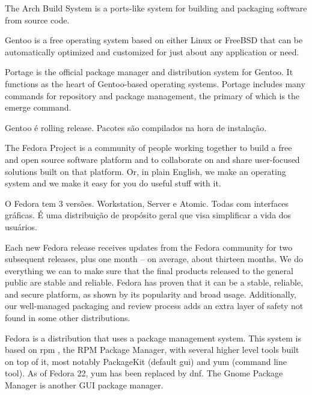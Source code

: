 \documentclass[
	article,			%
	12pt,				%
	openright,			%
	oneside,			%
	a4paper,			%
	chapter=TITLE,		%
	section=TITLE,		%
	subsection=TITLE,	%
	subsubsection=TITLE,%
	subsubsubsection=TITLE, %
	english,			%
	brazil,				%
	]{abntex2}
\begin{document}
\cite{ArchWiki2018c}

The Arch Build System is a ports-like system for building and packaging software from source code.

\cite{ArchWiki2018d}


Gentoo is a free operating system based on either Linux or FreeBSD that can be automatically optimized and customized for just about any application or need.

\cite{GentooWiki2018}

Portage is the official package manager and distribution system for Gentoo. It functions as the heart of Gentoo-based operating systems. Portage includes many commands for repository and package management, the primary of which is the emerge command.

\cite{GentooFundation2018}

Gentoo é rolling release.
Pacotes são compilados na hora de instalação.


The Fedora Project is a community of people working together to build a free and open source software platform and to collaborate on and share user-focused solutions built on that platform. Or, in plain English, we make an operating system and we make it easy for you do useful stuff with it.

\cite{FedoraProject2018}

O Fedora tem 3 versões. Workstation, Server e Atomic. Todas com interfaces gráficas. É uma distribuição de propósito geral que visa simplificar a vida dos usuários.

Each new Fedora release receives updates from the Fedora community for two subsequent releases, plus one month -- on average, about thirteen months. We do everything we can to make sure that the final products released to the general public are stable and reliable. Fedora has proven that it can be a stable, reliable, and secure platform, as shown by its popularity and broad usage. Additionally, our well-managed packaging and review process adds an extra layer of safety not found in some other distributions.

\cite{FedoraProject2018a}

Fedora is a distribution that uses a package management system. This system is based on rpm , the RPM Package Manager, with several higher level tools built on top of it, most notably PackageKit (default gui) and yum (command line tool). As of Fedora 22, yum has been replaced by dnf. The Gnome Package Manager is another GUI package manager. 
\end{document}
